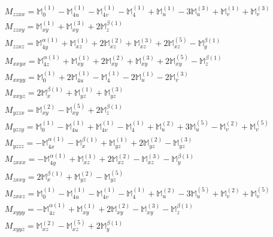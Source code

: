 \documentclass[fleqn,8pt,landscape]{jsarticle}
\begin{document}
\begin{align*}
& M_{zzxx} = \mathbb{M}_{0}^{(1)} - \mathbb{M}_{4u}^{(1)} - \mathbb{M}_{4v}^{(1)} - \mathbb{M}_{4}^{(1)} + \mathbb{M}_{u}^{(1)} - 3 \mathbb{M}_{u}^{(3)} + \mathbb{M}_{v}^{(1)} + \mathbb{M}_{v}^{(3)} \\
& M_{zzxy} = \mathbb{M}_{xy}^{(1)} + \mathbb{M}_{xy}^{(3)} + 2 \mathbb{M}_{z}^{\beta(1)} \\
& M_{zzxz} = \mathbb{M}_{4y}^{\alpha(1)} + \mathbb{M}_{xz}^{(1)} + 2 \mathbb{M}_{xz}^{(2)} + \mathbb{M}_{xz}^{(3)} + 2 \mathbb{M}_{xz}^{(5)} - \mathbb{M}_{y}^{\beta(1)} \\
& M_{xxyx} = \mathbb{M}_{4z}^{\alpha(1)} + \mathbb{M}_{xy}^{(1)} + 2 \mathbb{M}_{xy}^{(2)} + \mathbb{M}_{xy}^{(3)} + 2 \mathbb{M}_{xy}^{(5)} - \mathbb{M}_{z}^{\beta(1)} \\
& M_{xxyy} = \mathbb{M}_{0}^{(1)} + 2 \mathbb{M}_{4u}^{(1)} - \mathbb{M}_{4}^{(1)} - 2 \mathbb{M}_{u}^{(1)} - 2 \mathbb{M}_{v}^{(3)} \\
& M_{xxyz} = 2 \mathbb{M}_{x}^{\beta(1)} + \mathbb{M}_{yz}^{(1)} + \mathbb{M}_{yz}^{(3)} \\
& M_{yzzx} = \mathbb{M}_{xy}^{(2)} - \mathbb{M}_{xy}^{(5)} + 2 \mathbb{M}_{z}^{\beta(1)} \\
& M_{yzzy} = \mathbb{M}_{0}^{(1)} - \mathbb{M}_{4u}^{(1)} + \mathbb{M}_{4v}^{(1)} - \mathbb{M}_{4}^{(1)} + \mathbb{M}_{u}^{(2)} + 3 \mathbb{M}_{u}^{(5)} - \mathbb{M}_{v}^{(2)} + \mathbb{M}_{v}^{(5)} \\
& M_{yzzz} = - \mathbb{M}_{4x}^{\alpha(1)} - \mathbb{M}_{x}^{\beta(1)} + \mathbb{M}_{yz}^{(1)} + 2 \mathbb{M}_{yz}^{(2)} - \mathbb{M}_{yz}^{(3)} \\
& M_{zxxx} = - \mathbb{M}_{4y}^{\alpha(1)} + \mathbb{M}_{xz}^{(1)} + 2 \mathbb{M}_{xz}^{(2)} - \mathbb{M}_{xz}^{(3)} - \mathbb{M}_{y}^{\beta(1)} \\
& M_{zxxy} = 2 \mathbb{M}_{x}^{\beta(1)} + \mathbb{M}_{yz}^{(2)} - \mathbb{M}_{yz}^{(5)} \\
& M_{zxxz} = \mathbb{M}_{0}^{(1)} - \mathbb{M}_{4u}^{(1)} - \mathbb{M}_{4v}^{(1)} - \mathbb{M}_{4}^{(1)} + \mathbb{M}_{u}^{(2)} - 3 \mathbb{M}_{u}^{(5)} + \mathbb{M}_{v}^{(2)} + \mathbb{M}_{v}^{(5)} \\
& M_{xyyy} = - \mathbb{M}_{4z}^{\alpha(1)} + \mathbb{M}_{xy}^{(1)} + 2 \mathbb{M}_{xy}^{(2)} - \mathbb{M}_{xy}^{(3)} - \mathbb{M}_{z}^{\beta(1)} \\
& M_{xyyz} = \mathbb{M}_{xz}^{(2)} - \mathbb{M}_{xz}^{(5)} + 2 \mathbb{M}_{y}^{\beta(1)}
\end{align*}
\end{document}
